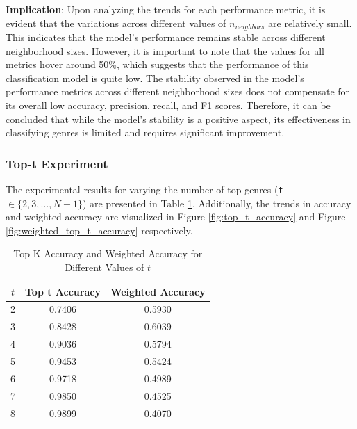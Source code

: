 \documentclass[times, twocolumn]{article}
\begin{document}
\textbf{Implication}:
Upon analyzing the trends for each performance metric, it is evident that the variations across different values of $n_{neighbors}$ are relatively small. This indicates that the model's performance remains stable across different neighborhood sizes. However, it is important to note that the values for all metrics hover around 50\%, which suggests that the performance of this classification model is quite low. The stability observed in the model's performance metrics across different neighborhood sizes does not compensate for its overall low accuracy, precision, recall, and F1 scores. Therefore, it can be concluded that while the model's stability is a positive aspect, its effectiveness in classifying genres is limited and requires significant improvement.

\subsubsection{Top-t Experiment}
The experimental results for varying the number of top genres (\verb|t| $\in \{2, 3, \ldots, N-1\}$) are presented in Table \ref{tab:top_t}. Additionally, the trends in accuracy and weighted accuracy are visualized in Figure \ref{fig:top_t_accuracy} and Figure \ref{fig:weighted_top_t_accuracy} respectively.

\begin{table}[h]
    \centering
    \caption{Top K Accuracy and Weighted Accuracy for Different Values of $t$}
    \label{tab:top_t}
    \begin{tabular}{|c||c|c|}
    \hline
    $t$ & Top t Accuracy & Weighted Accuracy \\
    \hline
    2 & 0.7406 & 0.5930 \\
    3 & 0.8428 & 0.6039 \\
    4 & 0.9036 & 0.5794 \\
    5 & 0.9453 & 0.5424 \\
    6 & 0.9718 & 0.4989 \\
    7 & 0.9850 & 0.4525 \\
    8 & 0.9899 & 0.4070 \\
    \hline
    \end{tabular}
\end{table}
\end{document}
